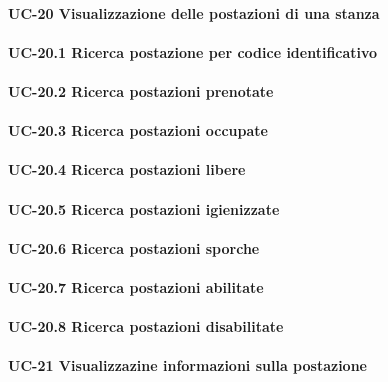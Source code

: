 
\paragraph{UC-20 Visualizzazione delle postazioni di una stanza}

    \paragraph{UC-20.1 Ricerca postazione per codice identificativo}

    \paragraph{UC-20.2 Ricerca postazioni prenotate}

    \paragraph{UC-20.3 Ricerca postazioni occupate}

    \paragraph{UC-20.4 Ricerca postazioni libere}

    \paragraph{UC-20.5 Ricerca postazioni igienizzate}

    \paragraph{UC-20.6 Ricerca postazioni sporche}

    \paragraph{UC-20.7 Ricerca postazioni abilitate}

    \paragraph{UC-20.8 Ricerca postazioni disabilitate}

    
\paragraph{UC-21 Visualizzazine informazioni sulla postazione}

